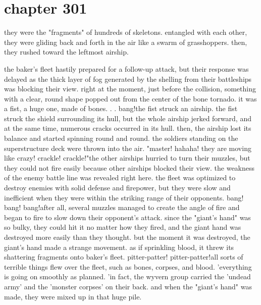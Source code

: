 \section{chapter 301}

they were the "fragments" of hundreds of skeletons.
 entangled with each other, they were gliding back and forth in the air like a swarm of grasshoppers.
 then, they rushed toward the leftmost airship.





the baker's fleet hastily prepared for a follow-up attack, but their response was delayed as the thick layer of fog generated by the shelling from their battleships was blocking their view.
right at the moment, just before the collision, something with a clear, round shape popped out from the center of the bone tornado.
it was a fist, a huge one, made of bones.
.
.
bang!the fist struck an airship.
 the fist struck the shield surrounding its hull, but the whole airship jerked forward, and at the same time, numerous cracks occurred in its hull.
then, the airship lost its balance and started spinning round and round.
 the soldiers standing on the superstructure deck were thrown into the air.
"master! hahaha! they are moving like crazy! crackle! crackle!"the other airships hurried to turn their muzzles, but they could not fire easily because other airships blocked their view.
the weakness of the enemy battle line was revealed right here.
 the fleet was optimized to destroy enemies with solid defense and firepower, but they were slow and inefficient when they were within the striking range of their opponents.
 bang! bang! bang!after all, several muzzles managed to create the angle of fire and began to fire to slow down their opponent's attack.
 since the "giant's hand" was so bulky, they could hit it no matter how they fired, and the giant hand was destroyed more easily than they thought.
but the moment it was destroyed, the giant's hand made a strange movement.
 as if sprinkling blood, it threw its shattering fragments onto baker's fleet.
pitter-patter! pitter-patter!all sorts of terrible things flew over the fleet, such as bones, corpses, and blood.
'everything is going on smoothly as planned.
'in fact, the wyvern group carried the 'undead army' and the 'monster corpses' on their back.
and when the "giant's hand" was made, they were mixed up in that huge pile.

